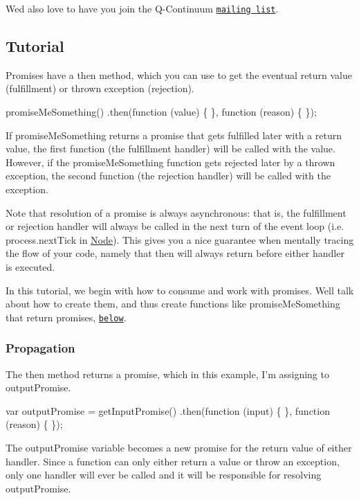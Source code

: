 We\textquotesingle{}d also love to have you join the Q-\/\+Continuum \href{https://groups.google.com/forum/#!forum/q-continuum}{\tt mailing list}.

\subsection*{Tutorial}

Promises have a {\ttfamily then} method, which you can use to get the eventual return value (fulfillment) or thrown exception (rejection).


\begin{DoxyCode}
promiseMeSomething()
.then(function (value) \{
\}, function (reason) \{
\});
\end{DoxyCode}


If {\ttfamily promise\+Me\+Something} returns a promise that gets fulfilled later with a return value, the first function (the fulfillment handler) will be called with the value. However, if the {\ttfamily promise\+Me\+Something} function gets rejected later by a thrown exception, the second function (the rejection handler) will be called with the exception.

Note that resolution of a promise is always asynchronous\+: that is, the fulfillment or rejection handler will always be called in the next turn of the event loop (i.\+e. {\ttfamily process.\+next\+Tick} in \mbox{\hyperlink{classNode}{Node}}). This gives you a nice guarantee when mentally tracing the flow of your code, namely that {\ttfamily then} will always return before either handler is executed.

In this tutorial, we begin with how to consume and work with promises. We\textquotesingle{}ll talk about how to create them, and thus create functions like {\ttfamily promise\+Me\+Something} that return promises, \href{#the-beginning}{\tt below}.

\subsubsection*{Propagation}

The {\ttfamily then} method returns a promise, which in this example, I’m assigning to {\ttfamily output\+Promise}.


\begin{DoxyCode}
var outputPromise = getInputPromise()
.then(function (input) \{
\}, function (reason) \{
\});
\end{DoxyCode}


The {\ttfamily output\+Promise} variable becomes a new promise for the return value of either handler. Since a function can only either return a value or throw an exception, only one handler will ever be called and it will be responsible for resolving {\ttfamily output\+Promise}.


